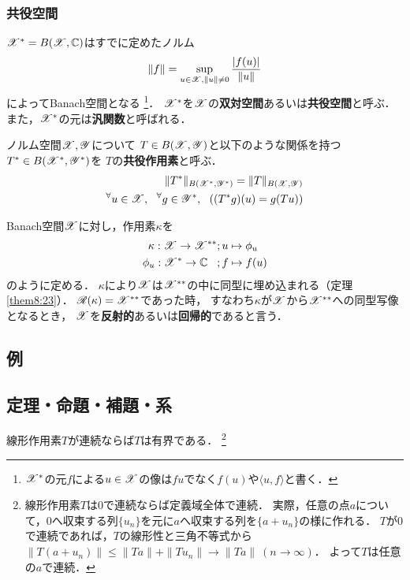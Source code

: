     \subsubsection{共役空間}
    \begin{Def}
        $\mathscr{X}^{\ast}=B(\mathscr{X}, \mathbb{C})$はすでに定めたノルム
        \[ \|f\|=\sup_{u \in \mathscr{X}, \| u \| \neq 0}{ \frac{|f(u)|}{\|u\|} } \]
        によってBanach空間となる
        \footnote{$\mathscr{X}^{\ast}$の元$f$による$u \in \mathscr{X}$の像は$fu$でなく$f(u)$や$\langle u,f \rangle$と書く．}．
        $\mathscr{X}^{\ast}$を$\mathscr{X}$の\textbf{双対空間}あるいは\textbf{共役空間}と呼ぶ．
        また，$\mathscr{X}^{\ast}$の元は\textbf{汎関数}と呼ばれる．
    \end{Def}
    \begin{Def}
        ノルム空間$\mathscr{X}, \mathscr{Y}$について
        $T \in B(\mathscr{X}, \mathscr{Y})$と以下のような関係を持つ$T^{\ast} \in B(\mathscr{X^{\ast}}, \mathscr{Y^{\ast}})$を
        $T$の\textbf{共役作用素}と呼ぶ．
        \begin{align*}
            \|T^{\ast}\|_{B(\mathscr{X^{\ast}}, \mathscr{Y^{\ast}})}=\|T\|_{B(\mathscr{X}, \mathscr{Y})} \\
            {}^{\forall} u \in \mathscr{X},~~ {}^{\forall} g \in \mathscr{Y^{\ast}},~~ ((T^{\ast}g)(u)=g(Tu))
        \end{align*}
    \end{Def}
    \begin{Def}
        Banach空間$\mathscr{X}$に対し，作用素$\kappa$を
        \begin{align*}
            \kappa: \spX \to \spX^{\ast \ast}     &;u \mapsto \phi_{u} \\
            \phi_u: \mathscr{X^{\ast}} \to \C \hspace{3truemm}&;f \mapsto f(u)
        \end{align*}
        のように定める．
        $\kappa$により$\mathscr{X}$は$\mathscr{X}^{\ast \ast}$の中に同型に埋め込まれる（定理\ref{them8:23}）．
        $\mathscr{R}(\kappa)=\mathscr{X}^{\ast \ast}$であった時，
        すなわち$\kappa$が$\mathscr{X}$から$\mathscr{X}^{\ast \ast}$への同型写像となるとき，
        $\mathscr{X}$を\textbf{反射的}あるいは\textbf{回帰的}であると言う．
    \end{Def}

    \subsection{例}

    \subsection{定理・命題・補題・系}
    \begin{Them}[定理7.1, p.148] \label{them7:1}
        線形作用素$T$が連続ならば$T$は有界である．
        \footnote{線形作用素$T$は0で連続ならば定義域全体で連続．
        実際，任意の点$a$について，0へ収束する列$\{u_n\}$を元に$a$へ収束する列を$\{a+u_n\}$の様に作れる．
        $T$が0で連続であれば，$T$の線形性と三角不等式から$\|T(a+u_n)\| \leq \|Ta\|+\|Tu_n\| \to \|Ta\|~(n \to \infty)$．
        よって$T$は任意の$a$で連続．}
    \end{Them}

